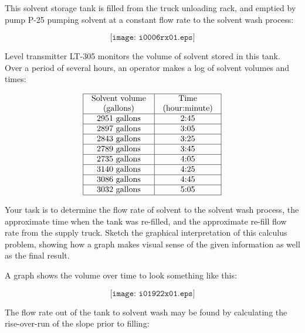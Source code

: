 

This solvent storage tank is filled from the truck unloading rack, and emptied by pump P-25 pumping solvent at a constant flow rate to the solvent wash process:

$$\texttt{[image: i0006rx01.eps]}$$

Level transmitter LT-305 monitors the volume of solvent stored in this tank.  Over a period of several hours, an operator makes a log of solvent volumes and times:


$$\vbox{\offinterlineskip
\halign{\strut
\vrule \quad\hfil # \ \hfil & 
\vrule \quad\hfil # \ \hfil \vrule \cr
\noalign{\hrule}
%
Solvent volume & Time \cr
(gallons) & (hour:minute) \cr
%
\noalign{\hrule}
%
2951 gallons & 2:45 \cr
%
\noalign{\hrule}
%
2897 gallons & 3:05 \cr
%
\noalign{\hrule}
%
2843 gallons & 3:25 \cr
%
\noalign{\hrule}
%
2789 gallons & 3:45 \cr
%
\noalign{\hrule}
%
2735 gallons & 4:05 \cr
%
\noalign{\hrule}
%
3140 gallons & 4:25 \cr
%
\noalign{\hrule}
%
3086 gallons & 4:45 \cr
%
\noalign{\hrule}
%
3032 gallons & 5:05 \cr
%
\noalign{\hrule}
} %
}$$ %

\vskip 10pt

Your task is to determine the flow rate of solvent to the solvent wash process, the approximate time when the tank was re-filled, and the approximate re-fill flow rate from the supply truck.  Sketch the graphical interpretation of this calculus problem, showing how a graph makes visual sense of the given information as well as the final result.







A graph shows the volume over time to look something like this:

$$\texttt{[image: i01922x01.eps]}$$

The flow rate out of the tank to solvent wash may be found by calculating the rise-over-run of the slope prior to filling:

